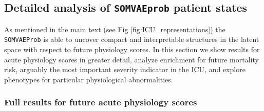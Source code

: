 \subsection{Detailed analysis of \texttt{SOMVAEprob} patient states}
\label{subsec:detailed_icu}

As mentioned in the main text (see Fig \ref{fig:ICU_representations}) the \texttt{SOMVAEProb}
is able to uncover compact and interpretable structures in the latent space with respect
to future physiology scores. In this section we show results for acute physiology scores
in greater detail, analyze enrichment for future mortality risk, arguably the most
important severity indicator in the ICU, and explore phenotypes for particular 
physiological abnormalities.


\subsubsection*{Full results for future acute physiology scores}

